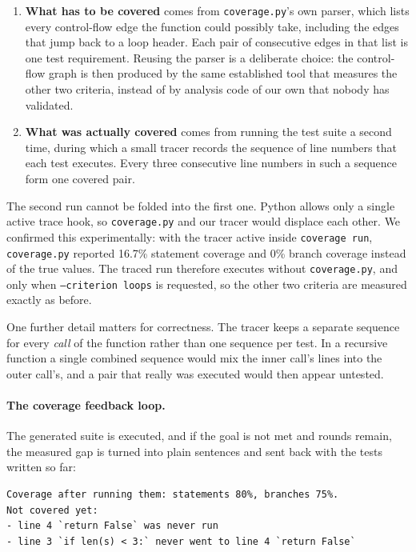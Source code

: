 \documentclass[11pt,a4paper]{article}
\begin{document}
\begin{enumerate}\itemsep3pt
  \item \textbf{What has to be covered} comes from \texttt{coverage.py}'s own parser, which lists every
        control-flow edge the function could possibly take, including the edges that jump back to a loop
        header. Each pair of consecutive edges in that list is one test requirement. Reusing the parser is a
        deliberate choice: the control-flow graph is then produced by the same established tool that measures
        the other two criteria, instead of by analysis code of our own that nobody has validated.
  \item \textbf{What was actually covered} comes from running the test suite a second time, during which a
        small tracer records the sequence of line numbers that each test executes. Every three consecutive
        line numbers in such a sequence form one covered pair.
\end{enumerate}

The second run cannot be folded into the first one. Python allows only a single active trace hook, so
\texttt{coverage.py} and our tracer would displace each other. We confirmed this experimentally: with the
tracer active inside \texttt{coverage run}, \texttt{coverage.py} reported 16.7\% statement coverage and 0\%
branch coverage instead of the true values. The traced run therefore executes without \texttt{coverage.py}, and
only when \texttt{--criterion loops} is requested, so the other two criteria are measured exactly as before.

One further detail matters for correctness. The tracer keeps a separate sequence for every \emph{call} of the
function rather than one sequence per test. In a recursive function a single combined sequence would mix the
inner call's lines into the outer call's, and a pair that really was executed would then appear untested.


\paragraph{The coverage feedback loop.} The generated suite is executed, and if the goal is not met and rounds
remain, the measured gap is turned into plain sentences and sent back with the tests written so far:

\begin{lstlisting}[style=plain]
Coverage after running them: statements 80%, branches 75%.
Not covered yet:
- line 4 `return False` was never run
- line 3 `if len(s) < 3:` never went to line 4 `return False`
\end{lstlisting}
\end{document}
